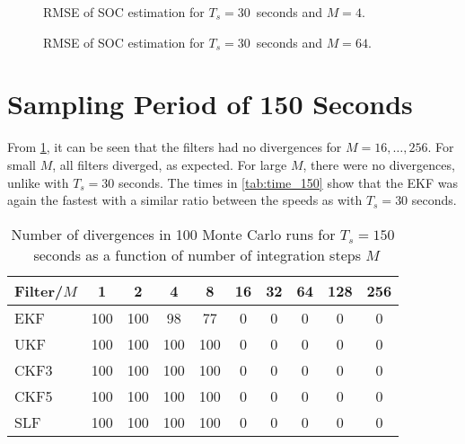 \documentclass[../zhang_thesis.tex]{subfiles}
\begin{document}
\begin{figure}[h]
\centering
%
\caption{RMSE of SOC estimation for $T_s=30$~seconds and $M=4$.}
\label{fig:rmse_30_4}
\end{figure}

\begin{figure}
\centering
%
\caption{RMSE of SOC estimation for $T_s=30$~seconds and $M=64$.}
\label{fig:rmse_30_64}
\end{figure}

\clearpage

\section{Sampling Period of 150 Seconds}

From \cref{tab:div_150}, it can be seen that the filters had no divergences for $M=16,\dots,256$. For small $M$, all filters diverged, as expected. For large $M$, there were no divergences, unlike with $T_s=30$ seconds. The times in \cref{tab:time_150} show that the EKF was again the fastest with a similar ratio between the speeds as with $T_s=30$ seconds. 

\begin{table}[h]
\centering
\caption{Number of divergences in 100 Monte Carlo runs for $T_s=150$~seconds as a function of number of integration steps $M$}
\begin{tabular}{@{}l*{9}{c}@{}}
\toprule
Filter/$M$ & 1   & 2   & 4   & 8   & 16 & 32 & 64 & 128 & 256 \\
\midrule
EKF        & 100 & 100 & 98  & 77  & 0  & 0  & 0  & 0   & 0   \\
UKF        & 100 & 100 & 100 & 100 & 0  & 0  & 0  & 0   & 0   \\
CKF3       & 100 & 100 & 100 & 100 & 0  & 0  & 0  & 0   & 0   \\
CKF5       & 100 & 100 & 100 & 100 & 0  & 0  & 0  & 0   & 0   \\
SLF        & 100 & 100 & 100 & 100 & 0  & 0  & 0  & 0   & 0   \\
\bottomrule
\end{tabular}
\label{tab:div_150}
\end{table}
\end{document}
